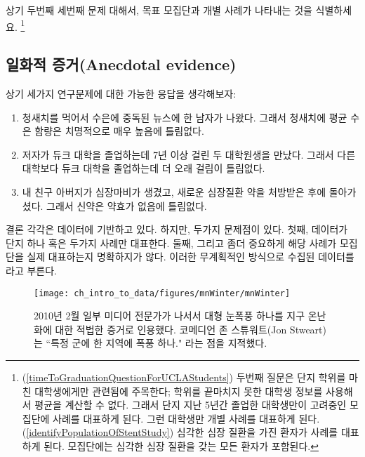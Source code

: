 \begin{exercise} \label{identifyingThePopulationForTwoQuestionsInPopAndSampSubsection}
상기 두번째 세번째 문제 대해서, 목표 모집단과 개별 사례가 나타내는 것을 식별하세요.
\footnote{(\ref{timeToGraduationQuestionForUCLAStudents}) 
두번째 질문은 단지 학위를 마친 대학생에게만 관련됨에 주목한다; 학위를 끝마치지 못한 대학생 정보를 사용해서 평균을 계산할 수 없다.
그래서 단지 지난 5년간 졸업한 대학생만이 고려중인 모집단에 사례를 대표하게 된다.
그런 대학생만  개별 사례를 대표하게 된다. (\ref{identifyPopulationOfStentStudy}) 
심각한 심장 질환을 가진 환자가 사례를 대표하게 된다. 모집단에는 심각한 심장 질환을 갖는 모든 환자가 포함된다.}
\end{exercise}


\subsection{일화적 증거(Anecdotal evidence)}
\label{anecdotalEvidenceSubsection}

상기 세가지 연구문제에 대한 가능한 응답을 생각해보자:

\begin{enumerate}
\item 청새치를 먹어서 수은에 중독된 뉴스에 한 남자가 나왔다. 그래서 청새치에 평균 수은 함량은 치명적으로 매우 높음에 틀림없다.

\item\label{iKnowThreeStudentsWhoTookMoreThan7YearsToGraduateAtDuke} 
저자가 듀크 대학을 졸업하는데 7년 이상 걸린 두 대학원생을 만났다. 그래서 다른 대학보다 듀크 대학을 졸업하는데 더 오래 걸림이 틀림없다.
\item\label{myFriendsDadDiedAfterSulphinpyrazon} 
내 친구 아버지가 심장마비가 생겼고, 새로운 심장질환 약을 처방받은 후에 돌아가셨다. 그래서 신약은 약효가 없음에 틀림없다.
\end{enumerate}

결론 각각은 데이터에 기반하고 있다. 하지만, 두가지 문제점이 있다.
첫째, 데이터가 단지 하나 혹은 두가지 사례만 대표한다.
둘째, 그리고 좀더 중요하게 해당 사례가 모집단을 실제 대표하는지 명확하지가 않다.
이러한 무계획적인 방식으로 수집된 데이터를 라고 부른다.

\setlength{\captionwidth}{\textwidth-80mm}
\begin{figure}
\centering
\hspace{8mm}\texttt{[image: ch\_intro\_to\_data/figures/mnWinter/mnWinter]}\hspace{4mm}
\begin{minipage}[b]{\textwidth - 80mm}
   \caption[anecdotal evidence]{
   2010년 2월 일부 미디어 전문가가 나서서 대형 눈폭풍 하나를 지구 온난화에 대한 적법한 증거로 인용했다.
   코메디언 존 스튜워트(Jon Stweart)는 ``특정 군에 한 지역에 폭풍 하나." 라는 점을 지적했다.
   \label{mnWinter}}
\end{minipage}
\end{figure}
\setlength{\captionwidth}{\mycaptionwidth}

